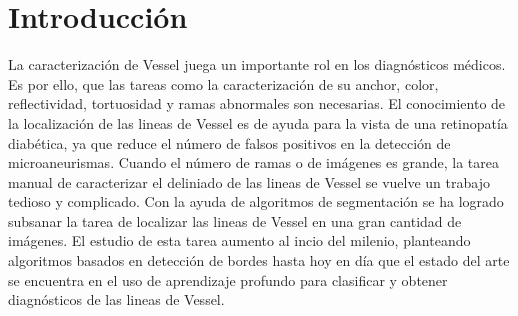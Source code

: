 \section{Introducción}

La caracterización de Vessel juega un importante rol en los diagnósticos médicos. Es por ello, que las tareas como la caracterización de su anchor, color, reflectividad, tortuosidad y ramas abnormales son necesarias. El conocimiento de la localización de las lineas de Vessel es de ayuda para la vista de una retinopatía diabética, ya que reduce el número de falsos positivos en la detección de microaneurismas\cite{Spencer_1996,Allan_1998,Larsen_2003}. Cuando el número de ramas o de imágenes es grande, la tarea manual de caracterizar el deliniado de las lineas de Vessel se vuelve un trabajo tedioso y complicado. Con la ayuda de algoritmos de segmentación se ha logrado subsanar la tarea de localizar las lineas de Vessel en una gran cantidad de imágenes. El estudio de esta tarea aumento al incio del milenio, planteando algoritmos basados en detección de bordes\cite{Staal_2004} hasta hoy en día que el estado del arte se encuentra en el uso de aprendizaje profundo\cite{Abber_2022} para clasificar y obtener diagnósticos de las lineas de Vessel.